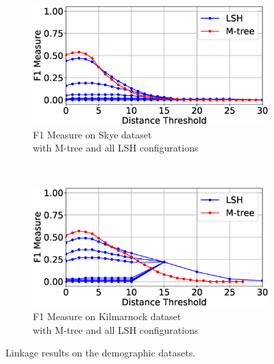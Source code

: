 \documentclass{llncs}
\begin{document}
\begin{figure}[t]
\begin{subfigure}{.47\textwidth}
  \centering
\includegraphics[width=\textwidth]{figures/plotFs-skye-f}
\vspace{-6mm}
\caption{F1 Measure on Skye dataset \\ with M-tree and all LSH configurations}
\end{subfigure}%
~~
\begin{subfigure}{.47\textwidth}
  \centering
\includegraphics[width=\textwidth]{figures/plotFs-kilmarnock-f}
\vspace{-6mm}
\caption{F1 Measure on Kilmarnock dataset \\ with M-tree and all LSH configurations}
\end{subfigure}
\caption{Linkage results on the demographic datasets.}
\label{demography-quality}
\end{figure}

\end{document}
